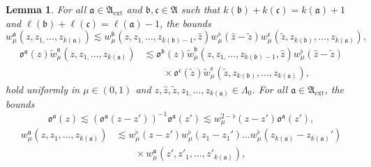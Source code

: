 \documentclass{article}
\numberwithin{equation}{section}
\theoremstyle{plain}
\newtheorem{lemma}[theorem]{Lemma}
\theoremstyle{definition}
\begin{document}
\begin{lemma}
  \label{lem:weight-factorization}For all $\mathfrak{a} \in
  \mathfrak{A}_{\mathrm{ext}}$ and $\mathfrak{b}, \mathfrak{c} \in
  \mathfrak{A}$ such that $k (\mathfrak{b}) + k
  (\mathfrak{c}) = k (\mathfrak{a}) + 1$ and $\ell (\mathfrak{b}) + \ell
  (\mathfrak{c}) = \ell (\mathfrak{a}) - 1$, the bounds
  \begin{equation}
    w_{\mu}^{\mathfrak{a}} (z, z_{1,} \ldots, z_{k (\mathfrak{a})})
    {\lesssim w_{\mu}^{\mathfrak{b}}}  (z, z_{1,} \ldots, z_{k
    (\mathfrak{b}) - 1}, \hat{z}) w^{\flat}_{\mu} (\hat{z}  - \tilde{z})
    w_{\mu}^{\mathfrak{c}} (\tilde{z}, z_{k (\mathfrak{b})}, \ldots, z_{k
    (\mathfrak{a})}), \label{eq:weight-w}
  \end{equation}
  \begin{equation}
    \begin{aligned}
      \mathfrak{o}^{\mathfrak{a}} (z)
      \tilde{w}_{\mu}^{\mathfrak{a}}
      (z, z_{1,} \ldots, z_{k (\mathfrak{a})})
      & \lesssim
      \mathfrak{o}^{\mathfrak{b}} (z)
      {\tilde{w}_{\mu}^{\mathfrak{b}}}
      (z, z_{1,} \ldots, z_{k (\mathfrak{b}) - 1}, \hat{z})
      w^{\flat}_{\mu} (\hat{z}  - \tilde{z})\\
      &\qquad \times
      \mathfrak{o}^{\mathfrak{c}} (\tilde{z})
      \tilde{w}_{\mu}^{\mathfrak{c}}
      (\tilde{z}, z_{k (\mathfrak{b})}, \ldots, z_{k (\mathfrak{a})}),
    \end{aligned}
    \label{eq:weight-w-o}
  \end{equation}
  hold uniformly in $\mu \in (0, 1)$ and $z, \hat{z}, \tilde{z}, z_{1,}
  \ldots, z_{k (\mathfrak{a})} \in \Lambda_0$. For all $\mathfrak{a} \in
  \mathfrak{A}_{\mathrm{ext}}$, the bounds
  \begin{equation}
    \mathfrak{o}^{\mathfrak{a}} (z) \lesssim (\mathfrak{o}^{\mathfrak{a}} (z -
    z'))^{- 1} \mathfrak{o}^{\mathfrak{a}} (z') \lesssim w^{2 - \flat}_{\mu}
    (z - z') \mathfrak{o}^{\mathfrak{a}} (z'), \label{eq:weight-o}
  \end{equation}
  \begin{equation}
  	\begin{aligned}
    w^{\mathfrak{a}}_{\mu} (z, z_1, \ldots, z_{k (\mathfrak{a})}) &\lesssim
    w^{\flat}_{\mu} (z - z') w^{\flat}_{\mu} (z_1 - z_1') \ldots
    w^{\flat}_{\mu} (z_{k (\mathfrak{a})} - z_{k (\mathfrak{a})}')
    \\
    &\qquad\times
    w^{\mathfrak{a}}_{\mu} (z', z'_1, \ldots, z'_{k (\mathfrak{a})}),
   \end{aligned}

\end{equation}
\end{lemma}
\end{document}

